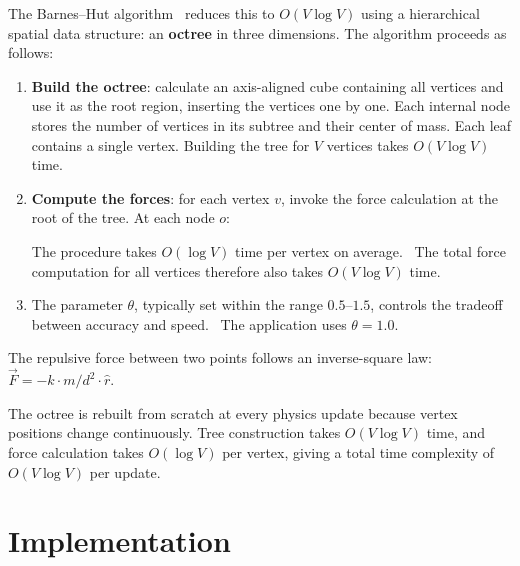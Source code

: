 The Barnes--Hut algorithm~\cite{barneshut1986,barneshut_princeton} reduces this to $O(V \log V)$ using a hierarchical spatial data structure: an \textbf{octree} in three dimensions. The algorithm proceeds as follows:

\begin{enumerate}
\item \textbf{Build the octree}: calculate an axis-aligned cube containing all vertices and use it as the root region, inserting the vertices one by one. Each internal node stores the number of vertices in its subtree and their center of mass. Each leaf contains a single vertex. Building the tree for $V$ vertices takes $O(V \log V)$ time.~\cite{barneshut1986}
\item \textbf{Compute the forces}: for each vertex $v$, invoke the force calculation at the root of the tree. At each node $o$:
    The procedure takes $O(\log V)$ time per vertex on average.~\cite{barneshut1986} The total force computation for all vertices therefore also takes $O(V \log V)$ time.
\item The parameter $\theta$, typically set within the range $0.5$--$1.5$, controls the tradeoff between accuracy and speed.~\cite{barneshut1986} The application uses $\theta = 1.0$.
\end{enumerate}

The repulsive force between two points follows an inverse-square law: $\vec{F} = -k \cdot m / d^2 \cdot \hat{r}$.

The octree is rebuilt from scratch at every physics update because vertex positions change continuously. Tree construction takes $O(V \log V)$ time, and force calculation takes $O(\log V)$ per vertex, giving a total time complexity of $O(V \log V)$ per update.

\section{Implementation}

